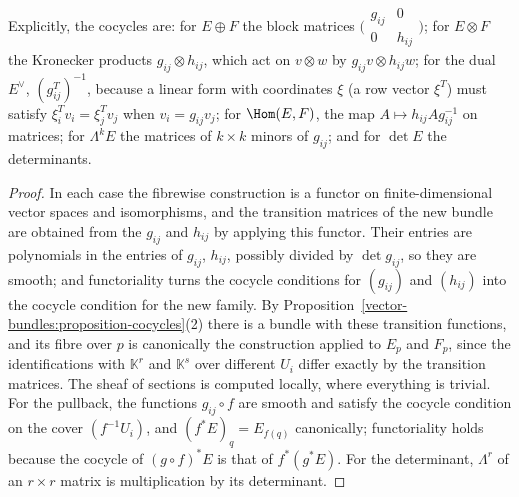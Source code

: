 Explicitly, the cocycles are: for $E \oplus F$ the block matrices $\bigl(\begin{smallmatrix} g_{ij} & 0\\ 0 & h_{ij}\end{smallmatrix}\bigr)$; for $E \otimes F$ the Kronecker products
$g_{ij} \otimes h_{ij}$, which act on $v \otimes w$ by $g_{ij}v \otimes h_{ij}w$; for the dual $E^\vee$, $(g_{ij}^T)^{-1}$, because a linear form with coordinates $\xi$ (a row vector
$\xi^T$) must satisfy $\xi_i^Tv_i = \xi_j^Tv_j$ when $v_i = g_{ij}v_j$; for $\Hom(E, F)$, the map $A \mapsto h_{ij}Ag_{ij}^{-1}$ on matrices; for $\Lambda^kE$ the matrices of $k \times k$
minors of $g_{ij}$; and for $\det E$ the determinants.

\begin{proof}
In each case the fibrewise construction is a functor on finite-dimensional vector spaces and isomorphisms, and the transition matrices of the new bundle are obtained from the
$g_{ij}$ and $h_{ij}$ by applying this functor. Their entries are polynomials in the entries of $g_{ij}$, $h_{ij}$, possibly divided by $\det g_{ij}$, so they are smooth; and functoriality
turns the cocycle conditions for $(g_{ij})$ and $(h_{ij})$ into the cocycle condition for the new family. By Proposition~\ref{vector-bundles:proposition-cocycles}(2) there is a bundle with
these transition functions, and its fibre over $p$ is canonically the construction applied to $E_p$ and $F_p$, since the identifications with $\mathbb{K}^r$ and $\mathbb{K}^s$ over different
$U_i$ differ exactly by the transition matrices. The sheaf of sections is computed locally, where everything is trivial. For the pullback, the functions $g_{ij} \circ f$ are smooth and
satisfy the cocycle condition on the cover $(f^{-1}U_i)$, and $(f^*E)_q = E_{f(q)}$ canonically; functoriality holds because the cocycle of $(g \circ f)^*E$ is that of $f^*(g^*E)$.
For the determinant, $\Lambda^r$ of an $r \times r$ matrix is multiplication by its determinant.
\end{proof}

